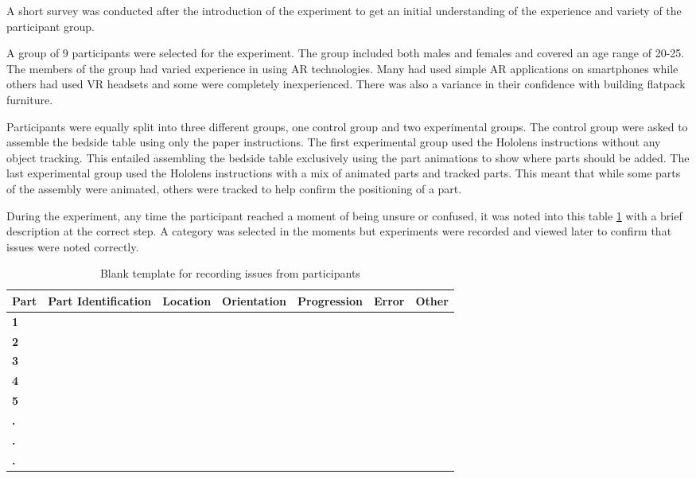 \documentclass{l4proj}
\begin{document}
A short survey was conducted after the introduction of the experiment to get an initial understanding of the experience and variety of the participant group.

A group of 9 participants were selected for the experiment. The group included both males and females and covered an age range of 20-25. The members of the group had varied experience in using AR technologies. Many had used simple AR applications on smartphones while others had used VR headsets and some were completely inexperienced. There was also a variance in their confidence with building flatpack furniture. %

Participants were equally split into three different groups, one control group and two experimental groups. The control group were asked to assemble the bedside table using only the paper instructions. The first experimental group used the Hololens instructions without any object tracking. This entailed assembling the bedside table exclusively using the part animations to show where parts should be added. The last experimental group used the Hololens instructions with a mix of animated parts and tracked parts. This meant that while some parts of the assembly were animated, others were tracked to help confirm the positioning of a part.

During the experiment, any time the participant reached a moment of being unsure or confused, it was noted into this table \ref{tab:blankissues} with a brief description at the correct step. A category was selected in the moments but experiments were recorded and viewed later to confirm that issues were noted correctly.
    \begin{table}[!ht]
         \caption{
         Blank template for recording issues from participants
         }\label{tab:blankissues}
        \centering
        \begin{tabular}{@{}l|llllll@{}}
            \textbf{Part} & \textbf{Part Identification} & \textbf{Location} & \textbf{Orientation} & \textbf{Progression}  & \textbf{Error} & \textbf{Other} \\ \hline
            \textbf{1}  & ~ & ~ & ~ & ~ & ~ & ~ \\ 
            \textbf{2}  & ~ & ~ & ~ & ~ & ~ & ~ \\ 
            \textbf{3}  & ~ & ~ & ~ & ~ & ~ & ~ \\ 
            \textbf{4}  & ~ & ~ & ~ & ~ & ~ & ~ \\ 
            \textbf{5}  & ~ & ~ & ~ & ~ & ~ & ~ \\ 
            \textbf{.}  & ~ & ~ & ~ & ~ & ~ & ~ \\ 
            \textbf{.}  & ~ & ~ & ~ & ~ & ~ & ~ \\ 
            \textbf{.}  & ~ & ~ & ~ & ~ & ~ & ~ \\ 
        \end{tabular}
    \end{table}
\end{document}
